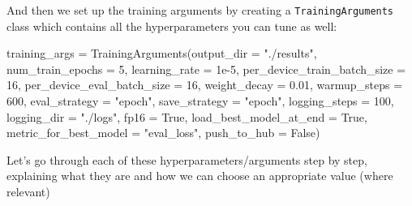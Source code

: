 \documentclass[
  letterpaper,
  DIV=11,
  numbers=noendperiod]{scrreprt}
\newenvironment{Shaded}{\begin{snugshade}}{\end{snugshade}}
\newcommand{\DecValTok}[1]{\textcolor[rgb]{0.68,0.00,0.00}{#1}}
\newcommand{\FloatTok}[1]{\textcolor[rgb]{0.68,0.00,0.00}{#1}}
\newcommand{\NormalTok}[1]{\textcolor[rgb]{0.00,0.23,0.31}{#1}}
\newcommand{\OperatorTok}[1]{\textcolor[rgb]{0.37,0.37,0.37}{#1}}
\newcommand{\StringTok}[1]{\textcolor[rgb]{0.13,0.47,0.30}{#1}}
\newcommand{\VariableTok}[1]{\textcolor[rgb]{0.07,0.07,0.07}{#1}}
\begin{document}
And then we set up the training arguments by creating a
\texttt{TrainingArguments} class which contains all the hyperparameters
you can tune as well:

\begin{Shaded}
\begin{Highlighting}[]
\NormalTok{training\_args }\OperatorTok{=}\NormalTok{ TrainingArguments(output\_dir }\OperatorTok{=} \StringTok{"./results"}\NormalTok{,}
\NormalTok{                                num\_train\_epochs }\OperatorTok{=} \DecValTok{5}\NormalTok{,}
\NormalTok{                                learning\_rate }\OperatorTok{=} \FloatTok{1e{-}5}\NormalTok{,}
\NormalTok{                                per\_device\_train\_batch\_size }\OperatorTok{=} \DecValTok{16}\NormalTok{,}
\NormalTok{                                per\_device\_eval\_batch\_size }\OperatorTok{=} \DecValTok{16}\NormalTok{,}
\NormalTok{                                weight\_decay }\OperatorTok{=} \FloatTok{0.01}\NormalTok{,}
\NormalTok{                                warmup\_steps }\OperatorTok{=} \DecValTok{600}\NormalTok{,}
\NormalTok{                                eval\_strategy }\OperatorTok{=} \StringTok{"epoch"}\NormalTok{,}
\NormalTok{                                save\_strategy }\OperatorTok{=} \StringTok{"epoch"}\NormalTok{,}
\NormalTok{                                logging\_steps }\OperatorTok{=} \DecValTok{100}\NormalTok{,}
\NormalTok{                                logging\_dir }\OperatorTok{=} \StringTok{"./logs"}\NormalTok{,}
\NormalTok{                                fp16 }\OperatorTok{=} \VariableTok{True}\NormalTok{,}
\NormalTok{                                load\_best\_model\_at\_end }\OperatorTok{=} \VariableTok{True}\NormalTok{,}
\NormalTok{                                metric\_for\_best\_model }\OperatorTok{=} \StringTok{"eval\_loss"}\NormalTok{,}
\NormalTok{                                push\_to\_hub }\OperatorTok{=} \VariableTok{False}\NormalTok{)}
\end{Highlighting}
\end{Shaded}

Let's go through each of these hyperparameters/arguments step by step,
explaining what they are and how we can choose an appropriate value
(where relevant)
\end{document}
